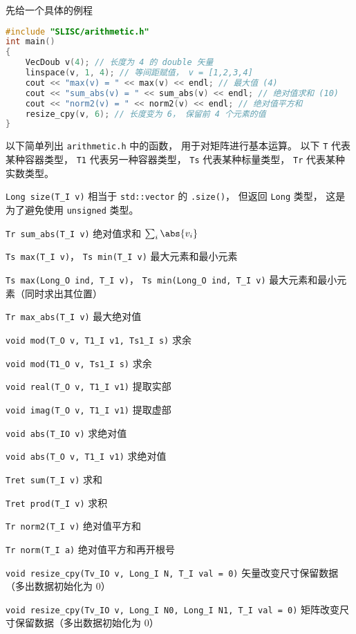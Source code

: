 

先给一个具体的例程
\begin{lstlisting}[language=cpp]
#include "SLISC/arithmetic.h"
int main()
{
    VecDoub v(4); // 长度为 4 的 double 矢量
    linspace(v, 1, 4); // 等间距赋值， v = [1,2,3,4]
    cout << "max(v) = " << max(v) << endl; // 最大值 (4)
    cout << "sum_abs(v) = " << sum_abs(v) << endl; // 绝对值求和 (10)
    cout << "norm2(v) = " << norm2(v) << endl; // 绝对值平方和
    resize_cpy(v, 6); // 长度变为 6， 保留前 4 个元素的值
}
\end{lstlisting}

以下简单列出 \verb`arithmetic.h` 中的函数， 用于对矩阵进行基本运算。 以下 \verb`T` 代表某种容器类型， \verb`T1` 代表另一种容器类型， \verb`Ts` 代表某种标量类型， \verb`Tr` 代表某种实数类型。

\verb`Long size(T_I v)` 相当于 \verb`std::vector` 的 \verb`.size()`， 但返回 \verb`Long` 类型， 这是为了避免使用 \verb`unsigned` 类型。

\verb`Tr sum_abs(T_I v)` 绝对值求和 $\sum_i \abs{v_i}$

\verb`Ts max(T_I v)`， \verb`Ts min(T_I v)` 最大元素和最小元素

\verb`Ts max(Long_O ind, T_I v)`， \verb`Ts min(Long_O ind, T_I v)` 最大元素和最小元素（同时求出其位置）

\verb`Tr max_abs(T_I v)` 最大绝对值

\verb`void mod(T_O v, T1_I v1, Ts1_I s)` 求余

\verb`void mod(T1_O v, Ts1_I s)` 求余

\verb`void real(T_O v, T1_I v1)` 提取实部

\verb`void imag(T_O v, T1_I v1)` 提取虚部

\verb`void abs(T_IO v)` 求绝对值

\verb`void abs(T_O v, T1_I v1)` 求绝对值

\verb`Tret sum(T_I v)` 求和

\verb`Tret prod(T_I v)` 求积

\verb`Tr norm2(T_I v)` 绝对值平方和

\verb`Tr norm(T_I a)` 绝对值平方和再开根号

\verb`void resize_cpy(Tv_IO v, Long_I N, T_I val = 0)` 矢量改变尺寸保留数据（多出数据初始化为 0）

\verb`void resize_cpy(Tv_IO v, Long_I N0, Long_I N1, T_I val = 0)` 矩阵改变尺寸保留数据（多出数据初始化为 0）

